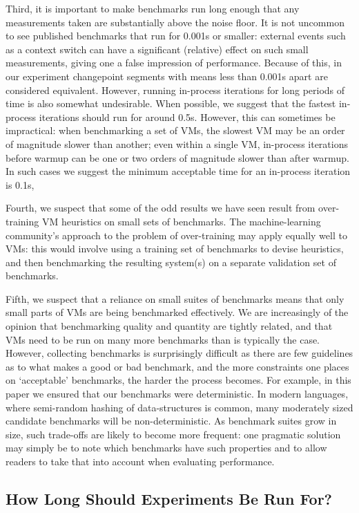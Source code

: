 \documentclass[acmsmall,screen]{acmart}
\begin{document}
Third, it is important to make benchmarks run long enough that any measurements
taken are substantially above the noise floor. It is not uncommon to see
published benchmarks that run for 0.001s or smaller: external events such as a context switch
can have a significant (relative) effect on such small measurements,
giving one a false impression of performance. Because of this,
in our experiment changepoint segments with means less than 0.001s
apart are considered equivalent. However, running in-process iterations for long periods
of time is also somewhat undesirable. When possible, we suggest that
the fastest in-process iterations should run for around 0.5s. However, this can
sometimes be impractical: when benchmarking a set of VMs, the slowest VM may be
an order of magnitude slower than another; even within a single VM,
in-process iterations before warmup can be one or two orders of magnitude slower
than after warmup. In such cases we suggest the minimum acceptable time for an
in-process iteration is 0.1s,

Fourth, we suspect that some of the odd results we have seen result from
over-training VM heuristics on small sets of benchmarks. The machine-learning
community's approach to the problem of over-training may apply equally well to VMs: this would involve
using a training set of benchmarks to devise heuristics, and then benchmarking
the resulting system(s) on a separate validation set of benchmarks.

Fifth, we suspect that a reliance on small suites of benchmarks means that
only small parts of VMs are being benchmarked effectively. We are increasingly
of the opinion that benchmarking quality and quantity are tightly related, and
that VMs need to be run on many more benchmarks than is typically the case.
However, collecting benchmarks is surprisingly difficult as there are few
guidelines as to what makes a good or bad benchmark, and the more constraints
one places on `acceptable' benchmarks, the harder the process becomes.
For example, in this paper we ensured that our benchmarks were deterministic. In
modern languages, where semi-random hashing of data-structures is common, many
moderately sized candidate benchmarks will be non-deterministic. As benchmark
suites grow in size, such trade-offs are likely to become more frequent: one
pragmatic solution may simply be to note which benchmarks have such properties
and to allow readers to take that into account when evaluating performance.


\subsection{How Long Should Experiments Be Run For?}
\label{how long}
\end{document}
